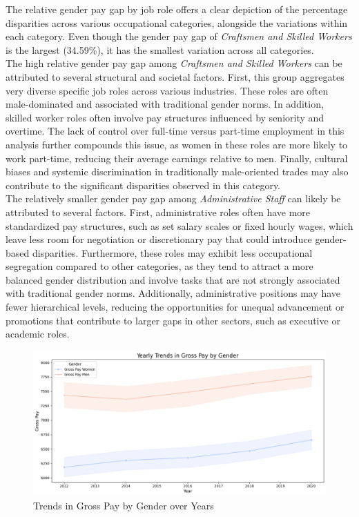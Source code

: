 \documentclass{article}
\begin{document}
The relative gender pay gap by job role offers a clear depiction of the percentage disparities across various occupational categories, alongside the variations within each category. Even though the gender pay gap of \textit{Craftsmen and Skilled Workers} is the largest (34.59\%), it has the smallest variation across all categories.\\


The high relative gender pay gap among \textit{Craftsmen and Skilled Workers} can be attributed to several structural and societal factors. First, this group aggregates very diverse specific job roles across various industries. These roles are often male-dominated and associated with traditional gender norms. In addition, skilled worker roles often involve pay structures influenced by seniority and overtime. The lack of control over full-time versus part-time employment in this analysis further compounds this issue, as women in these roles are more likely to work part-time, reducing their average earnings relative to men. Finally, cultural biases and systemic discrimination in traditionally male-oriented trades may also contribute to the significant disparities observed in this category.\\

The relatively smaller gender pay gap among \textit{Administrative Staff} can likely be attributed to several factors. First, administrative roles often have more standardized pay structures, such as set salary scales or fixed hourly wages, which leave less room for negotiation or discretionary pay that could introduce gender-based disparities. Furthermore, these roles may exhibit less occupational segregation compared to other categories, as they tend to attract a more balanced gender distribution and involve tasks that are not strongly associated with traditional gender norms. Additionally, administrative positions may have fewer hierarchical levels, reducing the opportunities for unequal advancement or promotions that contribute to larger gaps in other sectors, such as executive or academic roles. \\


\begin{figure}[h]
    \centering
    \includegraphics[width=1\textwidth]{Figures/Trends_Gross_Pay_Gender.png}
    \caption{Trends in Gross Pay by Gender over Years}
    \label{fig:gross_trend}
\end{figure}
\end{document}
